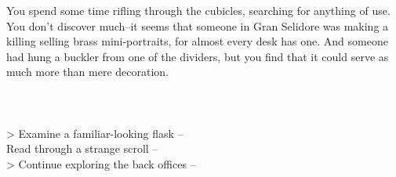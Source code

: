 You spend some time rifling through the cubicles, searching for anything of use. You don’t discover much--it seems that someone in Gran Selidore was making a killing selling brass mini-portraits, for almost every desk has one. And someone had hung a buckler from one of the dividers, but you find that it could serve as much more than mere decoration.\\
\\
\\
\\

> Examine a familiar-looking flask -- \\
 Read through a strange scroll -- \\
> Continue exploring the back offices -- 